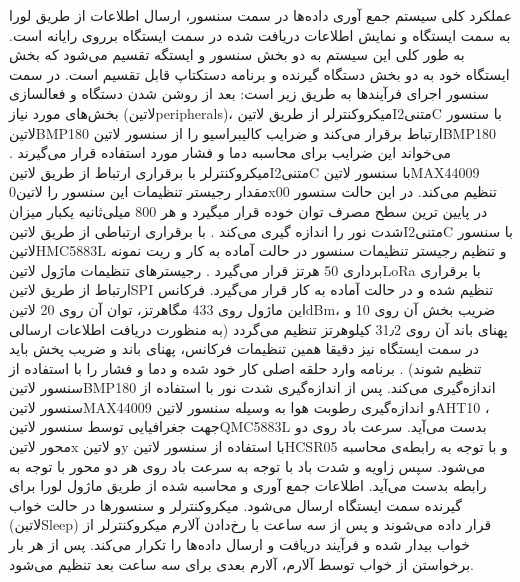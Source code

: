 عملکرد کلی سیستم جمع آوری داده‌ها در سمت سنسور، ارسال اطلاعات از طریق لورا به سمت ایستگاه و نمایش اطلاعات دریافت شده در سمت ایستگاه برروی رایانه است. به طور کلی این سیستم به دو بخش سنسور و ایستگه تقسیم می‌شود که بخش ایستگاه خود به دو بخش دستگاه گیرنده و برنامه دستکتاپ قابل تقسیم است. در سمت سنسور اجرای فرآیند‌ها به طریق زیر است: 
بعد از روشن شدن دستگاه و فعالسازی بخش‌های مورد نیاز (‌لاتین{peripherals})، میکروکنترلر از طریق ‌لاتین{I‌متنی{2}C} با سنسور ‌لاتین{BMP180} ارتباط برقرار می‌کند و ضرایب کالیبراسیو را از سنسور ‌لاتین{BMP180} می‌خواند این ضرایب برای محاسبه دما و فشار مورد استفاده قرار می‌گیرند .
میکروکنترلر با برقراری ارتباط از طریق ‌لاتین{I‌متنی{2}C} با سنسور ‌لاتین{MAX44009} مقدار رجیستر تنظیمات این سنسور را ‌لاتین{0x00} تنظیم می‌کند. در این حالت سنسور در پایین ترین سطح مصرف توان خوده قرار میگیرد و هر 800 میلی‌ثانیه یکبار میزان شدت نور را اندازه گیری می‌کند .
با برقراری ارتباطی از طریق ‌لاتین{I‌متنی{2}C} با سنسور ‌لاتین{HMC5883L} و تنظیم رجیستر تنظیمات سنسور در حالت آماده به کار و ریت نمونه برداری 50 هرتز قرار می‌گیرد .
رجیستر‌های تنظیمات ماژول ‌لاتین{LoRa} با برقراری ارتباط از طریق ‌لاتین{SPI} تنظیم شده و در حالت آماده به کار قرار می‌گیرد. فرکانس این ماژول روی 433 مگاهرتز، توان آن روی 20 ‌لاتین{dBm}، ضریب بخش آن روی 10 و پهنای باند آن روی 31٫2 کیلوهرتز تنظیم می‌گردد (به منظورت دریافت اطلاعات ارسالی در سمت ایستگاه نیز دقیقا همین تنظیمات فرکانس، پهنای باند و ضریب پخش باید تنظیم شوند) .
برنامه وارد حلقه اصلی کار خود شده و دما و فشار را با استفاده از سنسور ‌لاتین{BMP180} اندازه‌گیری می‌کند. 
پس از اندازه‌گیری شدت نور با استفاده از سنسور ‌لاتین{MAX44009}  و اندازه‌گیری رطوبت هوا به وسیله سنسور ‌لاتین{AHT10} ، جهت جغرافیایی توسط سنسور ‌لاتین{QMC5883L}  بدست می‌آید. 
سرعت باد روی دو محور ‌لاتین{x} و ‌لاتین{y} با استفاده از سنسور ‌لاتین{HCSR05} و با توجه به رابطه‌ی  محاسبه می‌شود. سپس زاویه و شدت باد با توجه به سرعت باد روی هر دو محور با توجه به رابطه  بدست می‌آید.
اطلاعات جمع آوری و محاسبه شده از طریق ماژول لورا برای گیرنده سمت ایستگاه ارسال می‌شود.
میکروکنترلر و سنسور‌ها در حالت خواب (‌لاتین{Sleep}) قرار داده می‌شوند و پس از سه ساعت با رخ‌دادن آلارم میکرو‌کنترلر از خواب بیدار شده و فرآیند دریافت و ارسال داده‌ها را تکرار می‌کند.
پس از هر بار برخواستن از خواب توسط آلارم، آلارم بعدی برای سه ساعت بعد تنظیم می‌شود.

